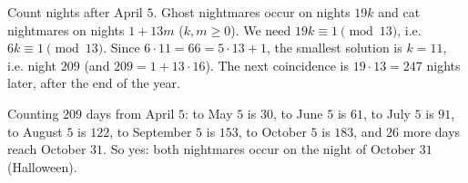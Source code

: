Count nights after April $5$. Ghost nightmares occur on nights $19k$ and cat nightmares on nights $1+13m$ ($k,m\ge0$). We need $19k\equiv1\pmod{13}$, i.e. $6k\equiv1\pmod{13}$. Since $6\cdot11=66=5\cdot13+1$, the smallest solution is $k=11$, i.e. night $209$ (and $209=1+13\cdot16$). The next coincidence is $19\cdot13=247$ nights later, after the end of the year.

Counting $209$ days from April $5$: to May $5$ is $30$, to June $5$ is $61$, to July $5$ is $91$, to August $5$ is $122$, to September $5$ is $153$, to October $5$ is $183$, and $26$ more days reach October $31$. So yes: both nightmares occur on the night of $\boxed{\text{October }31}$ (Halloween).
